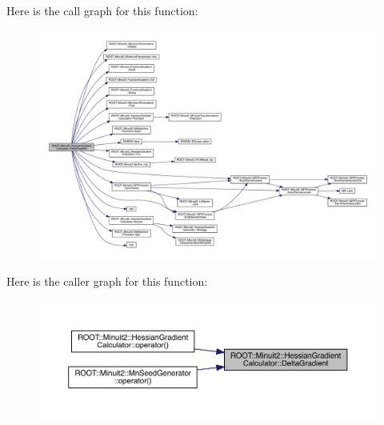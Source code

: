 Here is the call graph for this function\+:\nopagebreak
\begin{figure}[H]
\begin{center}
\leavevmode
\includegraphics[width=350pt]{dc/d17/classROOT_1_1Minuit2_1_1HessianGradientCalculator_ace21cdfb201391d53a015e373977c2d1_cgraph}
\end{center}
\end{figure}
Here is the caller graph for this function\+:\nopagebreak
\begin{figure}[H]
\begin{center}
\leavevmode
\includegraphics[width=350pt]{dc/d17/classROOT_1_1Minuit2_1_1HessianGradientCalculator_ace21cdfb201391d53a015e373977c2d1_icgraph}
\end{center}
\end{figure}
\mbox{\label{classROOT_1_1Minuit2_1_1HessianGradientCalculator_a808c1f808c436fbb6b67cb8af13d0480}} 
